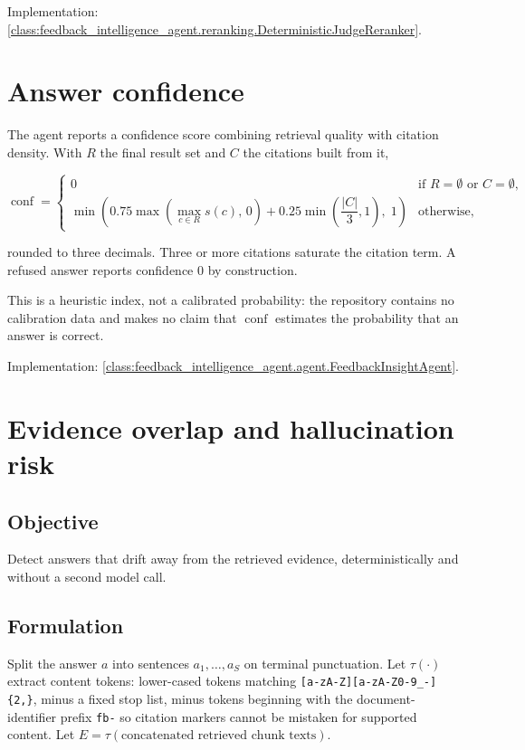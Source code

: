 \medskip\noindent
Implementation: \cref{class:feedback_intelligence_agent.reranking.DeterministicJudgeReranker}.

\section{Answer confidence}
\label{sec:math-confidence}

The agent reports a confidence score combining retrieval quality with citation
density. With $R$ the final result set and $C$ the citations built from it,

\begin{equation}
\operatorname{conf} =
\begin{cases}
  0 & \text{if } R = \emptyset \text{ or } C = \emptyset, \\[4pt]
  \min\!\left(
    0.75 \max\!\left(\max_{c \in R} s(c),\, 0\right)
    + 0.25 \min\!\left(\dfrac{|C|}{3}, 1\right),
    \; 1
  \right) & \text{otherwise,}
\end{cases}
\end{equation}

rounded to three decimals. Three or more citations saturate the citation term.
A refused answer reports confidence $0$ by construction.

This is a heuristic index, not a calibrated probability: the repository
contains no calibration data and makes no claim that $\operatorname{conf}$
estimates the probability that an answer is correct.

\medskip\noindent
Implementation: \cref{class:feedback_intelligence_agent.agent.FeedbackInsightAgent}.

\section{Evidence overlap and hallucination risk}
\label{sec:math-hallucination}

\subsection*{Objective}

Detect answers that drift away from the retrieved evidence, deterministically
and without a second model call.

\subsection*{Formulation}

Split the answer $a$ into sentences $a_1,\dots,a_S$ on terminal punctuation.
Let $\tau(\cdot)$ extract content tokens: lower-cased tokens matching
\texttt{[a-zA-Z][a-zA-Z0-9\_-]\{2,\}}, minus a fixed stop list, minus tokens
beginning with the document-identifier prefix \texttt{fb-} so citation markers
cannot be mistaken for supported content. Let $E = \tau(\text{concatenated
retrieved chunk texts})$.


